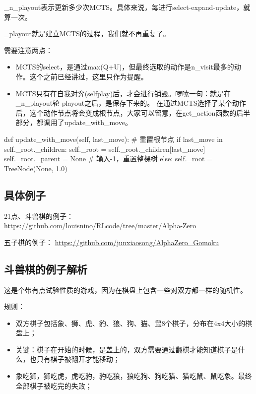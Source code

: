 \documentclass[12pt]{article}
\begin{document}
\_n\_playout表示更新多少次MCTS。具体来说，每进行select-expand-update，就算一次。

\_playout就是建立MCTS的过程，我们就不再重复了。

需要注意两点：
\begin{itemize}
\setlength{\itemsep}{0pt}
\setlength{\parsep}{0pt}
\setlength{\parskip}{0pt}
    \item MCTS的select，是通过max(Q+U)，但最终选取的动作是n\_visit最多的动作。这个之前已经讲过，这里只作为提醒。
    \item MCTS只有在自我对弈(selfplay)后，才会进行销毁。啰嗦一句：就是在\_n\_playout轮 playout之后，是保存下来的。 在通过MCTS选择了某个动作后，这个动作节点将会变成根节点，大家可以留意，在get\_action函数的后半部分，都调用了update\_with\_move。
\end{itemize}

\begin{python}
def update_with_move(self, last_move):
    # 重置根节点
    if last_move in self._root._children:
        self._root = self._root._children[last_move]
        self._root._parent = None
    # 输入-1，重置整棵树
    else:
        self._root = TreeNode(None, 1.0)
\end{python}

\subsection{具体例子}
21点、斗兽棋的例子：
\url{https://github.com/louisnino/RLcode/tree/master/Alpha-Zero}

五子棋的例子：
\url{https://github.com/junxiaosong/AlphaZero_Gomoku}

\subsection{斗兽棋的例子解析}
这是个带有点试验性质的游戏，因为在棋盘上包含一些对双方都一样的随机性。

规则：
\begin{itemize}
\setlength{\itemsep}{0pt}
\setlength{\parsep}{0pt}
\setlength{\parskip}{0pt}
    \item 双方棋子包括象、狮、虎、豹、狼、狗、猫、鼠8个棋子，分布在4x4大小的棋盘上；
    \item 关键：棋子在开始的时候，是盖上的，双方需要通过翻棋才能知道棋子是什么，也只有棋子被翻开才能移动；
    \item 象吃狮，狮吃虎，虎吃豹，豹吃狼，狼吃狗、狗吃猫、猫吃鼠、鼠吃象。最终全部棋子被吃完的失败；
\end{itemize}




\end{document}

